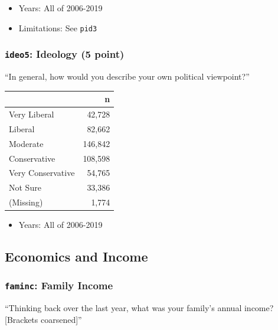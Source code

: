 \documentclass[10pt,article,oneside]{memoir}
\theoremstyle{definition}
\begin{document}
\begin{itemize}
\tightlist
\item
  Years: All of 2006-2019
\item
  Limitations: See \texttt{pid3}
\end{itemize}

\hypertarget{ideo5-ideology-5-point}{%
\subsubsection{\texorpdfstring{\texttt{ideo5}: Ideology (5
point)}{ideo5: Ideology (5 point)}}\label{ideo5-ideology-5-point}}

``In general, how would you describe your own political viewpoint?''

\begin{table}[H]
\centering
\begin{tabular}{lr}
\toprule
 & n\\
\midrule
Very Liberal & 42,728\\
Liberal & 82,662\\
Moderate & 146,842\\
Conservative & 108,598\\
Very Conservative & 54,765\\
Not Sure & 33,386\\
(Missing) & 1,774\\
\bottomrule
\end{tabular}
\end{table}

\begin{itemize}
\tightlist
\item
  Years: All of 2006-2019
\end{itemize}

\hypertarget{economics-and-income}{%
\subsection{Economics and Income}\label{economics-and-income}}

\hypertarget{faminc-family-income}{%
\subsubsection{\texorpdfstring{\texttt{faminc}: Family
Income}{faminc: Family Income}}\label{faminc-family-income}}

``Thinking back over the last year, what was your family's annual
income? {[}Brackets coarsened{]}''
\end{document}
